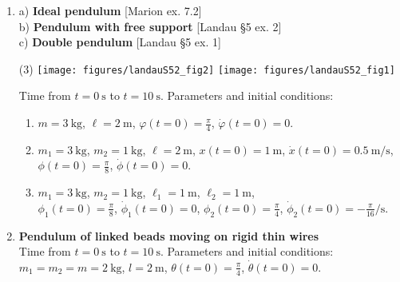 \documentclass[11pt, a4paper, twoside]{article}
\begin{document}
\begin{enumerate}
\item
	a) \textbf{Ideal pendulum} [Marion ex. 7.2] \\
	b) \textbf{Pendulum with free support} [Landau \S5 ex. 2]\\ 
	c) \textbf{Double pendulum} [Landau \S5 ex. 1] 
\begin{tasks}(3)
	\task 
	\task \texttt{[image: figures/landauS52\_fig2]}
	\task \texttt{[image: figures/landauS52\_fig1]}
\end{tasks}
Time from \(t = \SI{0}{\second}\) to \(t = \SI{10}{\second}\). Parameters and initial conditions:
\begin{enumerate}
	\item \(m = \SI{3}{\kilo\gram}\), 
				\(\ell = \SI{2}{\metre}\), 
				\(\varphi (t=0) = \frac{\pi}{4}\), \(\dot{\varphi} (t=0) = 0\).
	\item \(m_1 = \SI{3}{\kilo\gram}\), \(m_2 = \SI{1}{\kilo\gram}\),   
				\(\ell = \SI{2}{\metre}\), 
				\(x(t=0) = \SI{1}{\metre}\), \(\dot{x} (t=0) = \SI{0.5}{\metre\per\second} \),
				\(\phi (t=0) = \frac{\pi}{8}\), \(\dot{\phi} (t=0) = 0\).
	\item \(m_1 = \SI{3}{\kilo\gram}\), \(m_2 = \SI{1}{\kilo\gram}\),
				\(\ell_1 = \SI{1}{\metre}\), \(\ell_2 = \SI{1}{\metre}\),\\ 
				\(\phi_1 (t=0) = \frac{\pi}{8}\), \(\dot{\phi}_1 (t=0) = 0\), 
				\(\phi_2 (t=0) = \frac{\pi}{4}\), \(\dot{\phi}_2 (t=0) = -\frac{\pi}{16} \si{\per\second}\).
\end{enumerate}


\item 
	\begin{minipage}[t][2cm]{0.7\textwidth}
	\textbf{Pendulum of linked beads moving on rigid thin wires}\\
	Time from \(t = \SI{0}{\second}\) to \(t = \SI{10}{\second}\). Parameters and initial conditions:\\
	\(m_1 = m_2 = m = \SI{2}{\kilo\gram}\), \(l = \SI{2}{\metre}\), \(\theta(t=0) = \frac{\pi}{4}\), \(\dot{\theta}(t=0) = 0\).
	\end{minipage}
	\begin{minipage}[c][2cm][t]{0.3\textwidth}
		\hspace{0.5cm}
				
	\end{minipage}

	\newpage


\end{enumerate}
\end{document}
